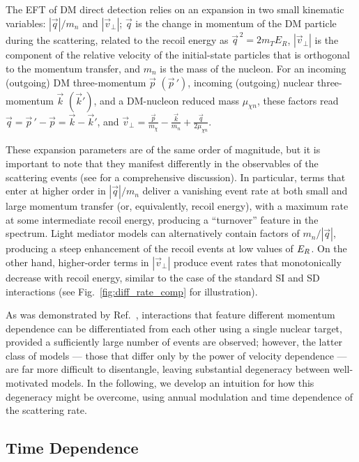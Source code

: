 \documentclass[11pt]{article}
\newcommand{\Fig}[1]{Fig.~\ref{#1}} \newcommand{\Figs}[2]{Figs.~\ref{#1} and \ref{#2}}
\begin{document}
The EFT of DM direct detection \cite{Fitzpatrick:2012ix, Anand:2013yka} relies on an expansion in two small kinematic variables: $|\vec q|/m_n$ and $|\vec v_\perp|$; $\vec q$ is the change in momentum of the DM particle during the scattering, related to the recoil energy as $\vec{q}^{\, 2} =2m_TE_R$, $|\vec v_\perp|$ is the component of the relative velocity of the initial-state particles that is orthogonal to the momentum transfer, and $m_n$ is the mass of the nucleon. For an incoming (outgoing) DM three-momentum $\vec p$ $(\vec p\,')$, incoming (outgoing) nuclear three-momentum $\vec k$ $(\vec k')$, and a DM-nucleon reduced mass $\mu_{\chi n}$, these factors read $\vec q=\vec p\,'-\vec p=\vec k-\vec k'$, and $\vec v_\perp=\frac{\vec p}{m_\chi}-\frac{\vec k}{m_n}+\frac{\vec q}{2\mu_{\chi n}}$. 


These expansion parameters are of the same order of magnitude, but it is important to note that they manifest differently in the observables of the scattering events (see \eg \cite{Gluscevic:2015sqa} for a comprehensive discussion). In particular, terms that enter at higher order in $|\vec q|/m_n$ deliver a vanishing event rate at both small and large momentum transfer (or, equivalently, recoil energy), with a maximum rate at some intermediate recoil energy, producing a ``turnover'' feature in the spectrum. Light mediator models can alternatively contain factors of $m_n/|\vec q|$, producing a steep enhancement of the recoil events at low values of $E_R$. On the other hand, higher-order terms in $| \vec v_\perp|$ produce event rates that monotonically decrease with recoil energy, similar to the case of the standard SI and SD interactions (see \Fig{fig:diff_rate_comp} for illustration).

As was demonstrated by Ref.~\cite{Gluscevic:2015sqa}, interactions that feature different momentum dependence can be differentiated from each other using a single nuclear target, provided a sufficiently large number of events are observed; however, the latter class of models --- those that differ only by the power of velocity dependence --- are far more difficult to disentangle, leaving substantial degeneracy between well-motivated models. In the following, we develop an intuition for how this degeneracy might be overcome, using annual modulation and time dependence of the scattering rate.

\subsection{Time Dependence}
\label{subsec:time}
\end{document}
